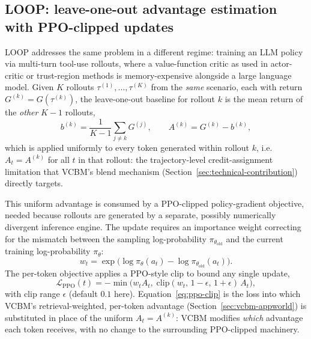 \documentclass[conference]{IEEEtran}
\begin{document}
\subsection{LOOP: leave-one-out advantage estimation with PPO-clipped updates}
\label{sec:prelim-loop}

LOOP \cite{b_chen2025loop} addresses the same problem in a different regime: training an LLM policy via multi-turn tool-use rollouts, where a value-function critic as used in actor-critic \cite{b_mnih2016a3c} or trust-region \cite{b_schulman2015trpo} methods is memory-expensive alongside a large language model. Given $K$ rollouts $\tau^{(1)}, \dots, \tau^{(K)}$ from the \emph{same} scenario, each with return $G^{(k)} = G(\tau^{(k)})$, the leave-one-out baseline for rollout $k$ \cite{b_kool2019buy} is the mean return of the \emph{other} $K-1$ rollouts,
\begin{equation}
  b^{(k)} = \frac{1}{K-1}\sum_{j \neq k} G^{(j)}, \qquad A^{(k)} = G^{(k)} - b^{(k)} ,
  \label{eq:loo-advantage}
\end{equation}
which is applied uniformly to every token generated within rollout $k$, i.e.\ $A_t = A^{(k)}$ for all $t$ in that rollout: the trajectory-level credit-assignment limitation that VCBM's blend mechanism (Section~\ref{sec:technical-contribution}) directly targets.

This uniform advantage is consumed by a PPO-clipped policy-gradient objective, needed because rollouts are generated by a separate, possibly numerically divergent inference engine. The update requires an importance weight correcting for the mismatch between the sampling log-probability $\pi_{\theta_{\mathrm{old}}}$ and the current training log-probability $\pi_\theta$:
\begin{equation}
  w_t = \exp\big(\log \pi_\theta(a_t) - \log \pi_{\theta_{\mathrm{old}}}(a_t)\big) .
  \label{eq:importance-weight}
\end{equation}
The per-token objective applies a PPO-style clip \cite{b_schulman2017ppo} to bound any single update,
\begin{equation}
  \mathcal{L}_{\mathrm{PPO}}(t) = -\min\Big(w_t A_t,\; \mathrm{clip}(w_t,\, 1-\epsilon,\, 1+\epsilon)\, A_t\Big) ,
  \label{eq:ppo-clip}
\end{equation}
with clip range $\epsilon$ (default $0.1$ here). Equation~\eqref{eq:ppo-clip} is the loss into which VCBM's retrieval-weighted, per-token advantage (Section~\ref{sec:vcbm-appworld}) is substituted in place of the uniform $A_t = A^{(k)}$: VCBM modifies \emph{which} advantage each token receives, with no change to the surrounding PPO-clipped machinery.
\end{document}
